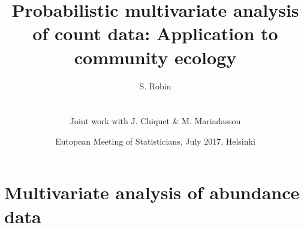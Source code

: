 \documentclass[10pt]{beamer}
\newcommand{\fignet}{/home/robin/Bureau/RECHERCHE/RESEAUX/EXPOSES/FIGURES}
\begin{document}

\title[Probabilistic PCA for counts]{Probabilistic multivariate analysis of count data: Application to community ecology}

\author[S. Robin]{S. Robin \\ ~\\
  \begin{tabular}{ll}
    Joint work with J. Chiquet \& M. Mariadassou
  \end{tabular}
  }


\date[EMS'17, Helsinki]{Eutopean Meeting of Statisticians, July 2017, Helsinki}

\maketitle

\section{Multivariate analysis of abundance data}
\frame{\tableofcontents[currentsection]}
\end{document}
